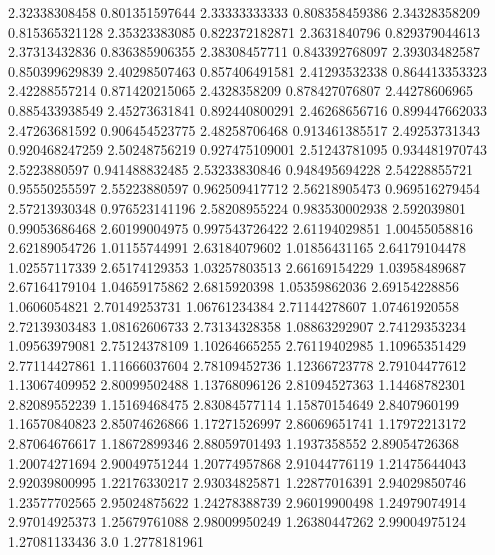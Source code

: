   2.32338308458   0.801351597644
  2.33333333333   0.808358459386
  2.34328358209   0.815365321128
  2.35323383085   0.822372182871
   2.3631840796   0.829379044613
  2.37313432836   0.836385906355
  2.38308457711   0.843392768097
  2.39303482587   0.850399629839
  2.40298507463   0.857406491581
  2.41293532338   0.864413353323
  2.42288557214   0.871420215065
   2.4328358209   0.878427076807
  2.44278606965   0.885433938549
  2.45273631841   0.892440800291
  2.46268656716   0.899447662033
  2.47263681592   0.906454523775
  2.48258706468   0.913461385517
  2.49253731343   0.920468247259
  2.50248756219   0.927475109001
  2.51243781095   0.934481970743
   2.5223880597   0.941488832485
  2.53233830846   0.948495694228
  2.54228855721    0.95550255597
  2.55223880597   0.962509417712
  2.56218905473   0.969516279454
  2.57213930348   0.976523141196
  2.58208955224   0.983530002938
    2.592039801    0.99053686468
  2.60199004975   0.997543726422
  2.61194029851    1.00455058816
  2.62189054726    1.01155744991
  2.63184079602    1.01856431165
  2.64179104478    1.02557117339
  2.65174129353    1.03257803513
  2.66169154229    1.03958489687
  2.67164179104    1.04659175862
   2.6815920398    1.05359862036
  2.69154228856     1.0606054821
  2.70149253731    1.06761234384
  2.71144278607    1.07461920558
  2.72139303483    1.08162606733
  2.73134328358    1.08863292907
  2.74129353234    1.09563979081
  2.75124378109    1.10264665255
  2.76119402985    1.10965351429
  2.77114427861    1.11666037604
  2.78109452736    1.12366723778
  2.79104477612    1.13067409952
  2.80099502488    1.13768096126
  2.81094527363    1.14468782301
  2.82089552239    1.15169468475
  2.83084577114    1.15870154649
   2.8407960199    1.16570840823
  2.85074626866    1.17271526997
  2.86069651741    1.17972213172
  2.87064676617    1.18672899346
  2.88059701493     1.1937358552
  2.89054726368    1.20074271694
  2.90049751244    1.20774957868
  2.91044776119    1.21475644043
  2.92039800995    1.22176330217
  2.93034825871    1.22877016391
  2.94029850746    1.23577702565
  2.95024875622    1.24278388739
  2.96019900498    1.24979074914
  2.97014925373    1.25679761088
  2.98009950249    1.26380447262
  2.99004975124    1.27081133436
            3.0     1.2778181961
